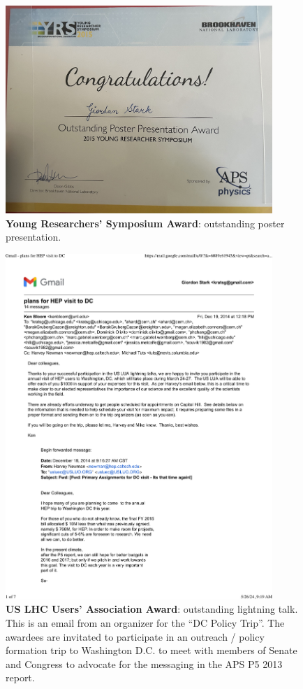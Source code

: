 \begin{figure}[h!]
	\centering
	\caption{\textbf{Young Researchers' Symposium Award}: outstanding poster presentation.}
	\includegraphics[width=0.9\textwidth]{attachments/D-research/YRS2015}
\end{figure}

\begin{figure}[h!]
	\centering
	\caption{\textbf{US LHC Users' Association Award}: outstanding lightning talk. This is an email from an organizer for the \enquote{DC Policy Trip}. The awardees are invitated to participate in an outreach / policy formation trip to Washington D.C. to meet with members of Senate and Congress to advocate for the messaging in the APS P5 2013 report.}
	\includegraphics[width=0.9\textwidth]{attachments/D-research/usluaWinner}
\end{figure}

